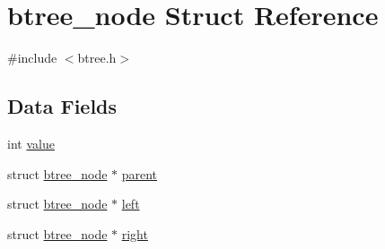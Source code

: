 \hypertarget{structbtree__node}{\section{btree\-\_\-node Struct Reference}
\label{structbtree__node}
}


{\ttfamily \#include $<$btree.\-h$>$}

\subsection*{Data Fields}
\begin{DoxyCompactItemize}
\item 
int \hyperlink{structbtree__node_a92f1076bdc6de97897d7071c8262d415}{value}
\item 
struct \hyperlink{structbtree__node}{btree\-\_\-node} $\ast$ \hyperlink{structbtree__node_a25d210269828a729ec00d451914a1d2a}{parent}
\item 
struct \hyperlink{structbtree__node}{btree\-\_\-node} $\ast$ \hyperlink{structbtree__node_a55f358b03c38061a2786959d2a12f3c0}{left}
\item 
struct \hyperlink{structbtree__node}{btree\-\_\-node} $\ast$ \hyperlink{structbtree__node_a4cb67aac590e5126f3e0c030fc5c3d02}{right}
\end{DoxyCompactItemize}


